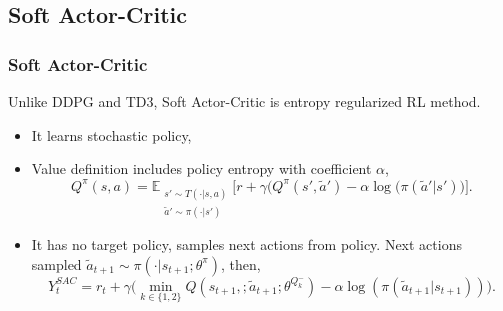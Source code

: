 \documentclass{beamer}
\begin{document}

\subsection{Soft Actor-Critic}
\begin{frame}
\frametitle{Soft Actor-Critic}
Unlike DDPG and TD3, Soft Actor-Critic is entropy regularized RL method. 
\begin{itemize}
	\item It learns stochastic policy,
	\item Value definition includes policy entropy with coefficient $\alpha$, 
	\begin{equation}
	\label{eqn:q_dfn_entreg}
	Q^{\pi}(s,a) = \mathbb{E}_{\substack{s'\sim T(\cdot|s,a)\\\widetilde{a}'\sim \pi(\cdot|s')} } \Big[r + \gamma \Big(Q^{\pi}(s',\widetilde{a}') -\alpha\log(\pi(\widetilde{a}'|s') \Big) \Big]. %
	\end{equation}
	\item It has no target policy, samples next actions from policy. Next actions sampled $\widetilde{a}_{t+1} \sim \pi(\cdot|s_{t+1}; \theta^{\pi})$, then, 
	\begin{equation}
	\label{eqn:q_target_sac}
	Y_t^{SAC} = r_t + \gamma \Big(\min_{k\in\{1,2\}} Q(s_{t+1}, ;\widetilde{a}_{t+1};\theta^{Q_k^-}) -\alpha\log(\pi(\widetilde{a}_{t+1}|s_{t+1})) \Big).
	\end{equation}
\end{itemize} 
\end{frame}
\end{document}
